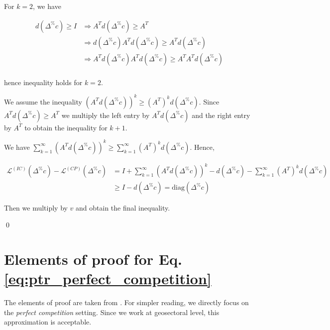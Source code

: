 \documentclass{article}
\begin{document}
\vspace{0.1cm}

\noindent For $k=2$, we have 

\begin{align*}
    d(\Delta^\%c) \geq I 
    & \Rightarrow A^T d(\Delta^\%c) \geq A^T \\
    & \Rightarrow d(\Delta^\%c) A^Td (\Delta^\%c) \geq A^T d(\Delta^\%c) \\
    & \Rightarrow A^T d(\Delta^\%c) A^T d(\Delta^\%c) \geq A^T A^T d(\Delta^\%c) \\
\end{align*}

\noindent hence inequality holds for $k=2$.

\vspace{0.1cm}

\noindent We assume the inequality $\left( A^T d(\Delta^\%c) \right)^k \geq \left( A^T \right)^k d(\Delta^\%c)$. Since $A^T d(\Delta^\%c) \geq A^T$ we multiply the left entry by $A^T d(\Delta^\%c)$ and the right entry by $A^T$ to obtain the inequality for $k+1$. 

\vspace{0.1cm}

\noindent We have $\sum_{k=1}^\infty \left( A^T d(\Delta^\%c) \right)^k \geq \sum_{k=1}^\infty \left( A^T \right)^k d(\Delta^\%c)$. Hence, 

\begin{align*}
    {\mathcal{L}^{(IC)}(\Delta^\%c)} - {\mathcal{L}^{(CP)}(\Delta^\%c)} & = I + \sum_{k=1}^\infty \left( A^T d(\Delta^\%c) \right)^k - d(\Delta^\%c) - \sum_{k=1}^\infty \left( A^T \right)^k d(\Delta^\%c) \\
    & \geq I - d(\Delta^\%c) = \text{diag}(\Delta^\%c)
\end{align*}

\noindent Then we multiply by $v$ and obtain the final inequality. 

\qed

\section{Elements of proof for Eq. \eqref{eq:ptr_perfect_competition}}
\label{appendix:ptr_formula}

The elements of proof are taken from \cite{weyl2013pass}. For simpler reading, we directly focus on the \textit{perfect competition} setting. Since we work at geosectoral level, this approximation is acceptable.

\vspace{0.1cm}
\end{document}
